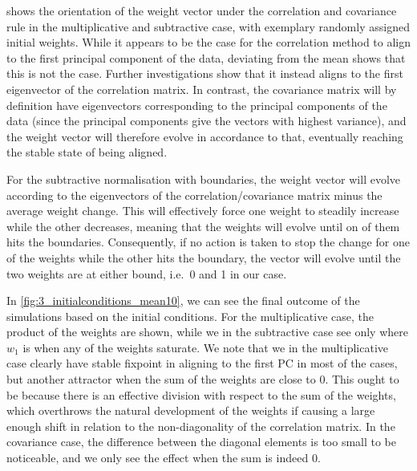 \documentclass[10pt]{article}\usepackage[]{graphicx}\usepackage[]{color}
\theoremstyle{plain}
\begin{document}
\begin{multicols*}{2}
 shows the orientation of the weight vector under the correlation and covariance rule in the multiplicative and subtractive case, with exemplary randomly assigned initial weights. While it appears to be the case for the correlation method to align to the first principal component of the data, deviating from the mean shows that this is not the case. Further investigations show that it instead aligns to the first eigenvector of the correlation matrix. In contrast, the covariance matrix will by definition have eigenvectors corresponding to the principal components of the data (since the principal components give the vectors with highest variance), and the weight vector will therefore evolve in accordance to that, eventually reaching the stable state of being aligned. 

For the subtractive normalisation with boundaries, the weight vector will evolve according to the eigenvectors of the correlation/covariance matrix minus the average weight change. This will effectively force one weight to steadily increase while the other decreases, meaning that the weights will evolve until on of them hits the boundaries. Consequently, if no action is taken to stop the change for one of the weights while the other hits the boundary, the vector will evolve until the two weights are at either bound, i.e.\ 0 and 1 in our case. 

In \cref{fig:3_initialconditions_mean10}, we can see the final outcome of the simulations based on the initial conditions. For the multiplicative case, the product of the weights are shown, while we in the subtractive case see only where $w_1$ is when any of the weights saturate. We note that we in the multiplicative case clearly have stable fixpoint in aligning to the first PC in most of the cases, but another attractor when the sum of the weights are close to 0. This ought to be because there is an effective division with respect to the sum of the weights, which overthrows the natural development of the weights if causing a large enough shift in relation to the non-diagonality of the correlation matrix. In the covariance case, the difference between the diagonal elements is too small to be noticeable, and we only see the effect when the sum is indeed 0. 


\begin{Schunk}
\begin{figure}[H]


\end{figure}
\end{Schunk}
\end{multicols*}
\end{document}
